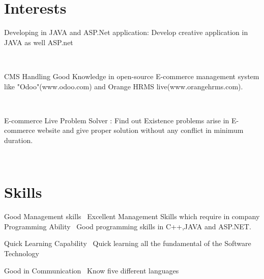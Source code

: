 \documentclass[]{cv-style}          %
\begin{document}
\section{Interests}
  \vspace{-0.3cm}
\begin{entrylist}
\entry
{}
{ Developing in JAVA and ASP.Net application:}
{}
{Develop creative application in JAVA as well ASP.net}

\end{entrylist}\
\begin{entrylist}
\entry
{}
{ CMS Handling}
{}
{Good Knowledge in open-source E-commerce management system like "Odoo"(www.odoo.com) and Orange HRMS live(www.orangehrms.com).}
\end{entrylist}\
\begin{entrylist}
\entry
{}
{E-commerce Live Problem Solver :}
{}
{Find out Existence problems arise in E-commerce website and give proper solution without any conflict in minimum duration.
}

\end{entrylist}\

\section{Skills}
  \vspace{-0.2cm}

\begin{entrylist}
\entry
  {}
  {Good Management skills}
  {}
  {\jobtitle{}\  Excellent Management Skills which require in company}
\entry
  {}
  {Programming Ability }
  {}
  {\jobtitle{}\  Good programming skills in C++,JAVA and ASP.NET.}
  
  \entry
  {}
  { Quick Learning Capability}
  {}
  {\jobtitle{}\ Quick learning all the fundamental of the Software Technology    }
  
  \entry
  {}
  {Good in Communication }
  {}
  {\jobtitle{}\  Know five different languages }
  

\end{entrylist}
\end{document}

